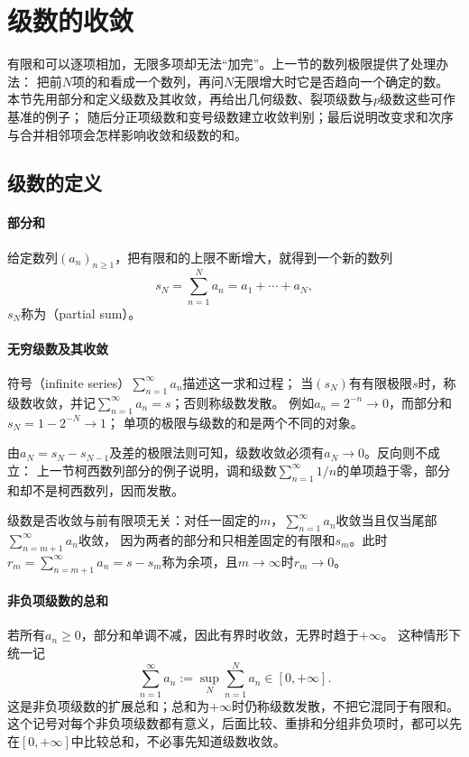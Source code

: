 \section{级数的收敛}
\label{sec:analysis-series}

有限和可以逐项相加，无限多项却无法“加完”。上一节的数列极限提供了处理办法：
把前$N$项的和看成一个数列，再问$N$无限增大时它是否趋向一个确定的数。
本节先用部分和定义级数及其收敛，再给出几何级数、裂项级数与$p$级数这些可作基准的例子；
随后分正项级数和变号级数建立收敛判别；最后说明改变求和次序与合并相邻项会怎样影响收敛和级数的和。

\subsection{级数的定义}
\label{sec:analysis-series-definition}

\paragraph{部分和}
给定数列$(a_n)_{n\geq1}$，把有限和的上限不断增大，就得到一个新的数列
\[
 s_N=\sum_{n=1}^{N}a_n=a_1+\cdots+a_N,
\]
$s_N$称为（partial sum）。

\paragraph{无穷级数及其收敛}
符号（infinite series）$\sum_{n=1}^{\infty}a_n$描述这一求和过程；
当$(s_N)$有有限极限$s$时，称级数收敛，并记$\sum_{n=1}^{\infty}a_n=s$；否则称级数发散。
例如$a_n=2^{-n}\to0$，而部分和$s_N=1-2^{-N}\to1$；
单项的极限与级数的和是两个不同的对象。

由$a_N=s_N-s_{N-1}$及差的极限法则可知，级数收敛必须有$a_N\to0$。反向则不成立：
上一节柯西数列部分的例子说明，调和级数$\sum_{n=1}^\infty1/n$的单项趋于零，部分和却不是柯西数列，因而发散。

级数是否收敛与前有限项无关：对任一固定的$m$，$\sum_{n=1}^\infty a_n$收敛当且仅当尾部$\sum_{n=m+1}^\infty a_n$收敛，
因为两者的部分和只相差固定的有限和$s_m$。此时$r_m=\sum_{n=m+1}^\infty a_n=s-s_m$称为余项，且$m\to\infty$时$r_m\to0$。

\paragraph{非负项级数的总和}
若所有$a_n\geq0$，部分和单调不减，因此有界时收敛，无界时趋于$+\infty$。
这种情形下统一记
\[
 \sum_{n=1}^{\infty}a_n:=\sup_N\sum_{n=1}^{N}a_n\in[0,+\infty].
\]
这是非负项级数的扩展总和；总和为$+\infty$时仍称级数发散，不把它混同于有限和。
这个记号对每个非负项级数都有意义，后面比较、重排和分组非负项时，都可以先在$[0,+\infty]$中比较总和，不必事先知道级数收敛。

